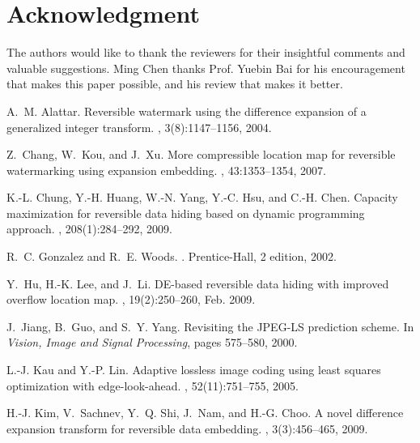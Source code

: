 \documentclass{sig-alternate}
\begin{document}
\section*{Acknowledgment}
The authors would like to thank the reviewers for their insightful comments and valuable
suggestions. Ming Chen thanks Prof. Yuebin Bai for his encouragement that makes this paper possible,
and his review that makes it better.

%
%

\begin{thebibliography}{10}

A.~M. Alattar.
\newblock Reversible watermark using the difference expansion of a generalized
  integer transform.
, 3(8):1147--1156, 2004.

Z.~Chang, W.~Kou, and J.~Xu.
\newblock More compressible location map for reversible watermarking using
  expansion embedding.
, 43:1353--1354, 2007.

K.-L. Chung, Y.-H. Huang, W.-N. Yang, Y.-C. Hsu, and C.-H. Chen.
\newblock Capacity maximization for reversible data hiding based on dynamic
  programming approach.
, 208(1):284--292, 2009.

R.~C. Gonzalez and R.~E. Woods.
.
\newblock Prentice-Hall, 2 edition, 2002.

Y.~Hu, H.-K. Lee, and J.~Li.
\newblock \uppercase{DE}-based reversible data hiding with improved overflow
  location map.
,
  19(2):250--260, Feb. 2009.

J.~Jiang, B.~Guo, and S.~Y. Yang.
\newblock Revisiting the \uppercase{JPEG-LS} prediction scheme.
\newblock In {\em Vision, Image and Signal Processing}, pages 575--580, 2000.

L.-J. Kau and Y.-P. Lin.
\newblock Adaptive lossless image coding using least squares optimization with
  edge-look-ahead.
, 52(11):751--755, 2005.

H.-J. Kim, V.~Sachnev, Y.~Q. Shi, J.~Nam, and H.-G. Choo.
\newblock A novel difference expansion transform for reversible data embedding.
, 3(3):456--465, 2009.


\end{thebibliography}
\end{document}
